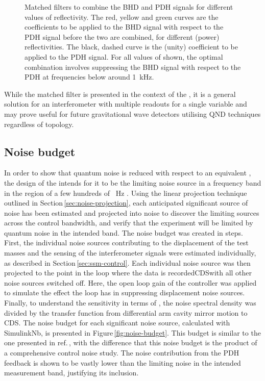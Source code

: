 \begin{figure}
  
  \caption[Matched filters to combine the balanced homodyne and Pound-Drever-Hall signals for different values of \MNINE{} reflectivity]{\label{fig:optimal-filters}Matched filters to combine the \gls{BHD} and \gls{PDH} signals for different values of \MNINE{} reflectivity. The red, yellow and green curves are the coefficients to be applied to the \gls{BHD} signal with respect to the \gls{PDH} signal before the two are combined, for different \MNINE{} (power) reflectivities. The black, dashed curve is the (unity) coefficient to be applied to the \gls{PDH} signal. For all values of \MNINE{} shown, the optimal combination involves suppressing the \gls{BHD} signal with respect to the \gls{PDH} at frequencies below around \SI{1}{\kilo\hertz}.}
\end{figure}

While the matched filter is presented in the context of the \SSMEXPT{}, it is a general solution for an interferometer with multiple readouts for a single variable and may prove useful for future gravitational wave detectors utilising \gls{QND} techniques regardless of topology.

\subsection{\label{sec:noise-budget}Noise budget}

In order to show that quantum noise is reduced with respect to an equivalent \FPMI{}, the design of the \SSMEXPT{} intends for it to be the limiting noise source in a frequency band in the region of a few hundreds of \SI{}{\hertz} \cite{Graef2014}. Using the linear projection technique outlined in Section\,\ref{sec:noise-projection}, each anticipated significant source of noise has been estimated and projected into \LMINUS{} noise to discover the limiting sources across the control bandwidth, and verify that the experiment will be limited by quantum noise in the intended band. The noise budget was created in steps. First, the individual noise sources contributing to the displacement of the test masses and the sensing of the interferometer signals were estimated individually, as described in Section\,\ref{sec:ssm-control}. Each individual noise source was then projected to the point in the loop where the data is recorded\textemdash \gls{CDS}\textemdash with all other noise sources switched off. Here, the open loop gain of the controller was applied to simulate the effect the loop has in suppressing displacement noise sources. Finally, to understand the sensitivity in terms of \LMINUS{}, the noise spectral density was divided by the transfer function from differential arm cavity mirror motion to \gls{CDS}. The noise budget for each significant noise source, calculated with SimulinkNb, is presented in Figure\,\ref{fig:noise-budget}. This budget is similar to the one presented in ref.\,\cite{Graef2014}, with the difference that this noise budget is the product of a comprehensive control noise study. The noise contribution from the \gls{PDH} feedback is shown to be vastly lower than the limiting noise in the intended measurement band, justifying its inclusion.

